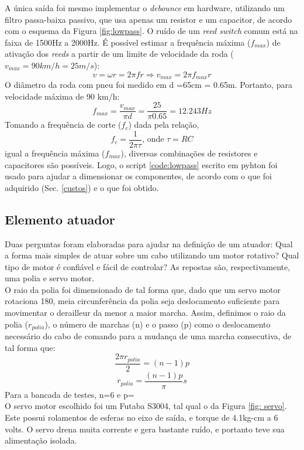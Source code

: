 \documentclass[a4paper,11pt]{article}
\begin{document}
A única saída foi mesmo implementar o \textit{debounce} em hardware, utilizando
um filtro passa-baixa passivo, que usa apenas um resistor e um capacitor, de
acordo com o esquema da Figura \ref{fig:lowpass}. O ruído de um \textit{reed
switch} comum está na faixa de 1500Hz a 2000Hz\cite{reed}. É possível estimar a
frequência máxima ($f_{max}$) de ativação dos \textit{reeds} a partir de um
limite de velocidade da roda ($v_{max} = 90 km/h = 25 m/s$):
\begin{equation}
  v = \omega r = 2\pi f r \Rightarrow v_{max} = 2\pi f_{max} r
\end{equation}
O diâmetro da roda com pneu foi medido em d =65cm = 0.65m. Portanto, para velocidade máxima de 90 km/h:
\begin{equation}
  f_{max} = \frac{\displaystyle v_{max}}{\displaystyle \pi d} =
\frac{\displaystyle 25}{\displaystyle \pi 0.65} = 12.243 Hz
\end{equation}
Tomando a frequência de corte ($f_{c}$) dada pela relação,
\begin{equation}
  f_{c} = \frac{\displaystyle 1}{\displaystyle 2\pi\tau} \text{, onde } \tau =
RC
\end{equation}
igual a frequência máxima ($f_{max}$), diversas combinações de resistores e
capacitores são possíveis. Logo, o script \ref{code:lowpass} escrito em
pyhton\cite{python} foi usado para ajudar a dimensionar os componentes, de
acordo com o que foi adquirido (Sec. \ref{custos}) e o que foi
obtido.


%
\subsection{Elemento atuador}
\label{atuador}
Duas perguntas foram elaboradas para ajudar na definição de um atuador: Qual a
forma mais simples de atuar sobre um cabo utilizando um motor rotativo? Qual
tipo de motor é confiável e fácil de controlar? As repostas são,
respectivamente, uma polia e servo motor. \\
O raio da polia foi dimensionado de tal forma que, dado que um servo motor
rotaciona 180\textdegree, meia circunferência da polia seja deslocamento
suficiente para movimentar o derailleur da menor a maior marcha. Assim,
definimos o raio da polia ($r_{polia}$), o número de marchas (n) e o passo (p)
como o deslocamento necessário do cabo de comando para a mudança de uma marcha
consecutiva, de tal forma que:
\begin{equation*}
  \frac{\displaystyle 2\pi r_{polia} }{\displaystyle 2} = (n-1)p
\end{equation*}
\begin{equation}
  r_{polia} = \frac{\displaystyle (n-1)p}{\displaystyle \pi}s
\end{equation} 
Para a bancada de testes, n=6 e p=%
\\O servo motor escolhido foi um Futaba S3004, tal qual o da Figura \ref{fig: servo}. Este possui rolamentos de esferas no eixo de saída, e torque de 4.1kg-cm a 6 volts. O servo drena muita corrente e gera bastante ruído, e portanto teve sua alimentação isolada.
\end{document}
